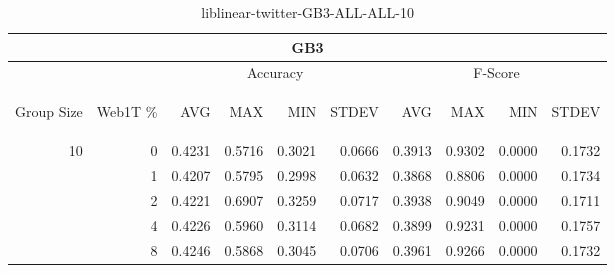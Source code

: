 \begin{center}
\begin{table}[htbp] 
 \begin{center}
\begin{tabular}{ | r | r | r | r | r | r | r | r | r | r |}
\hline
\multicolumn{10}{|c|}{GB3}\\
\hline
 & & \multicolumn{4}{|c|}{Accuracy} & \multicolumn{4}{|c|}{F-Score}\\ \cline{3-10}
\begin{sideways}Group Size\end{sideways} & \begin{sideways}Web1T \%\end{sideways} & \begin{sideways}AVG\end{sideways} & \begin{sideways}MAX\end{sideways} & \begin{sideways}MIN\end{sideways} & \begin{sideways}STDEV\end{sideways} & \begin{sideways}AVG\end{sideways} & \begin{sideways}MAX\end{sideways} & \begin{sideways}MIN\end{sideways} & \begin{sideways}STDEV\end{sideways}\\
\hline
\multirow{4}{*}{10}
 & 0 & 0.4231 & 0.5716 & 0.3021 & 0.0666 & 0.3913 & 0.9302 & 0.0000 & 0.1732\\ \cline{2-10}
 & 1 & 0.4207 & 0.5795 & 0.2998 & 0.0632 & 0.3868 & 0.8806 & 0.0000 & 0.1734\\ \cline{2-10}
 & 2 & 0.4221 & 0.6907 & 0.3259 & 0.0717 & 0.3938 & 0.9049 & 0.0000 & 0.1711\\ \cline{2-10}
 & 4 & 0.4226 & 0.5960 & 0.3114 & 0.0682 & 0.3899 & 0.9231 & 0.0000 & 0.1757\\ \cline{2-10}
 & 8 & 0.4246 & 0.5868 & 0.3045 & 0.0706 & 0.3961 & 0.9266 & 0.0000 & 0.1732\\ \cline{2-10}
\hline
\end{tabular}
\caption{liblinear-twitter-GB3-ALL-ALL-10}
\label{table:liblinear-twitter-GB3-ALL-ALL-10}
\end{center}
 \end{table}
\end{center}


